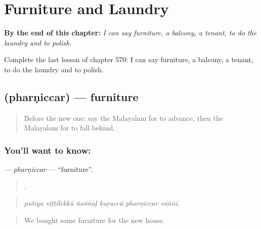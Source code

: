 
\chapter{Furniture and Laundry}
\label{ch:ml-furniture-and-laundry}

\begin{chapteropening}
\textbf{By the end of this chapter:} \emph{I can say furniture, a balcony, a tenant, to do the laundry and to polish.}

Complete the last lesson of chapter 570: I can say furniture, a balcony, a tenant, to do the laundry and to polish.
\end{chapteropening}

\section[\texorpdfstring{\ml{ഫർണിച്ചർ} (pharṇiccar)}{ഫർണിച്ചർ (pharṇiccar)}]{ (pharṇiccar) — furniture}

\label{lesson:ML-C570-pharniccar}



\begin{quote}
Before the new one: say the Malayalam for to advance, then the Malayalam for to fall behind.
\end{quote}

\subsection*{You'll want to know: }
\textbf{} — \emph{pharṇiccar} — \textquotedblleft{}furniture\textquotedblright{}.

\begin{quote}
     .
\end{quote}

\begin{quote}
\emph{putiya vīṭṭilēkkŭ ñaṅṅaḷ kuṟaccŭ pharṇiccar vāṅṅi.}
\end{quote}

\begin{quote}
We bought some furniture for the new house.
\end{quote}

